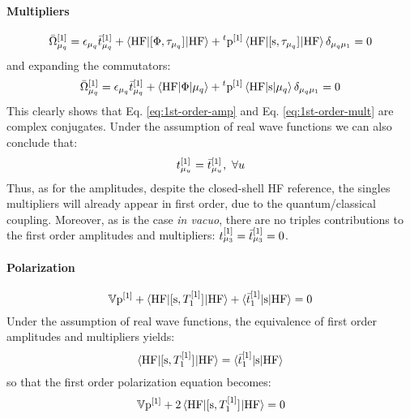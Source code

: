 \paragraph*{Multipliers}
\begin{equation}%
  \bar{\Omega}_{\mu_q}^{[1]} =
    \denom{\mu_q}\tbar{\mu_q}^{[1]}
    + \braket{\mathrm{HF} | \commutator{\Phi}{\cluster{\mu_q}} | \mathrm{HF}}
    + {}^t\p^{[1]}\braket{\mathrm{HF} |
    \commutator{\s}{\cluster{\mu_q}} | \mathrm{HF}}\delta_{\mu_q\mu_1} =0
\end{equation}
and expanding the commutators:
\begin{equation}\label{eq:1st-order-mult}
  \bar{\Omega}_{\mu_q}^{[1]} =
    \epsilon_{\mu_q}\bar{t}_{\mu_q}^{[1]}
    + \braket{\mathrm{HF} | \Phi | \mu_q}
    + {}^t\mathrm{p}^{[1]}\braket{\mathrm{HF} | \mathrm{s} | \mu_q}\delta_{\mu_q\mu_1} =0
\end{equation}
This clearly shows that Eq. \eqref{eq:1st-order-amp}
and Eq. \eqref{eq:1st-order-mult} are complex conjugates. Under the
assumption of real wave functions we can also conclude that:
\begin{equation}
  t_{\mu_u}^{[1]} = \bar{t}_{\mu_u}^{[1]},\,\,\forall u
\end{equation}
Thus, as for the amplitudes, despite the closed-shell \acrshort{HF} reference, the singles
multipliers will already appear in first order, due to the
quantum/classical coupling.
Moreover, as is the case \emph{in vacuo}, there are no triples contributions to
the first order amplitudes and multipliers: $t_{\mu_3}^{[1]} = \bar{t}_{\mu_3}^{[1]} = 0$.

\paragraph*{Polarization}
\begin{equation}%
  \V\p^{[1]} + \braket{\mathrm{HF} | \commutator{\s}{T_1^{[1]}}| \mathrm{HF}}
  + \braket{\tbar{1}^{[1]} | \s | \mathrm{HF} } = 0
\end{equation}
Under the assumption of real wave functions, the equivalence of
first order amplitudes and multipliers yields:
\begin{equation}
  \braket{\mathrm{HF} | [ \mathrm{s}, T_1^{[1]} ]^{}| \mathrm{HF}}
  = \braket{\bar{t}_{1}^{[1]} | \mathrm{s} | \mathrm{HF}}
\end{equation}
so that the first order polarization equation becomes:
\begin{equation}\label{eq:1st-order-pol}
  \mathbb{V}\mathrm{p}^{[1]} + 2\braket{\mathrm{HF} | [ \mathrm{s}, T_1^{[1]} ]^{}| \mathrm{HF}} = 0
\end{equation}


